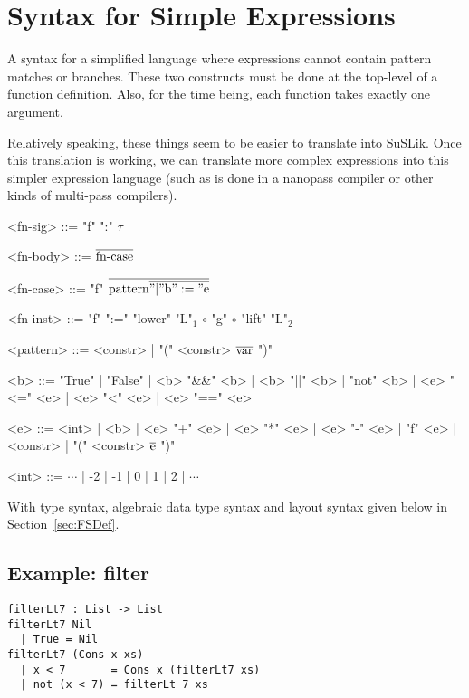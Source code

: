 \documentclass[10pt]{article}
\begin{document}
\section{Syntax for Simple Expressions}

A syntax for a simplified language where expressions cannot contain pattern matches or branches. These
two constructs must be done at the top-level of a function definition. Also, for the time being, each
function takes exactly one argument.

Relatively speaking, these things seem to be easier to translate into SuSLik. Once this translation
is working, we can translate more complex expressions into this simpler expression language (such as
is done in a nanopass compiler or other kinds of multi-pass compilers).

\begin{grammar}
  <fn-sig> ::= "f" ":" $\tau$

  <fn-body> ::= $\overline{\textnormal{fn-case}}$

  <fn-case> ::= "f" $\overline{\textnormal{pattern} \overline{" | " \textnormal{b} " := " \textnormal{e}}}$

  <fn-inst> ::= "f" ":=" "lower" "L"$_1$ $\circ$ "g" $\circ$ "lift" "L"$_2$

  <pattern> ::= <constr> | "(" <constr> $\overline{\textnormal{var}}$ ")"

  <b> ::= "True" | "False" | <b> "&&" <b> | <b> "||" <b> | "not" <b> | <e> "<=" <e> | <e> "<" <e>
    | <e> "==" <e>

  <e> ::= <int> | <b> | <e> "+" <e> | <e> "*" <e> | <e> "-" <e> | "f" <e> | <constr> | "(" <constr> $\overline{\textnormal{e}}$ ")"

  <int> ::= $\cdots$ | -2 | -1 | 0 | 1 | 2 | $\cdots$
\end{grammar}

\noindent
With type syntax, algebraic data type syntax and layout syntax given below in Section~\ref{sec:FSDef}.

\subsection{Example: filter}

\begin{lstlisting}
filterLt7 : List -> List
filterLt7 Nil
  | True = Nil
filterLt7 (Cons x xs)
  | x < 7       = Cons x (filterLt7 xs)
  | not (x < 7) = filterLt 7 xs
\end{lstlisting}
\end{document}
